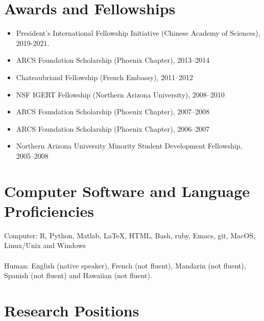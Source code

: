 \documentclass[a4paper]{article}
\begin{document}
\section{Awards and Fellowships}\label{awards-and-fellowships}

\begin{itemize}
\item President's International Fellowship Initiative (Chinese Academy
  of Sciences), 2019-2021.
\item
  ARCS Foundation Scholarship (Phoenix Chapter), 2013--2014
\item
  Chateaubriand Fellowship (French Embassy), 2011--2012
\item
  NSF IGERT Fellowship (Northern Arizona University), 2008--2010
\item
  ARCS Foundation Scholarship (Phoenix Chapter), 2007--2008
\item
  ARCS Foundation Scholarship (Phoenix Chapter), 2006--2007
\item
  Northern Arizona University Minority Student Development Fellowship,
  2005--2008
\end{itemize}

\section{Computer Software and Language
Proficiencies}\label{computer-software-and-language-proficiencies}

Computer: R, Python, Matlab, LaTeX, HTML, Bash, ruby, Emacs, git,
MacOS, Linux/Unix and Windows\\\\Human: English (native speaker),
French (not fluent), Mandarin (not fluent), Spanish (not fluent) and
Hawaiian (not fluent).

\section{Research Positions}\label{research-experience}
\end{document}
